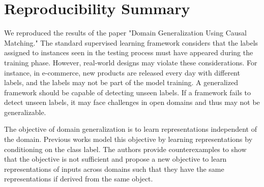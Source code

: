 \section*{\centering Reproducibility Summary}

We reproduced the results of the paper "Domain Generalization Using Causal Matching." The standard supervised learning framework considers that the labels assigned to instances seen in the testing process must have appeared during the training phase. However, real-world designs may violate these considerations. For instance, in e-commerce, new products are released every day with different labels, and the labels may not be part of the model training. A generalized framework should be capable of detecting unseen labels. If a framework fails to detect unseen labels, it may face challenges in open domains and thus may not be generalizable.

The objective of domain generalization is to learn representations independent of the domain. Previous works model this objective by learning representations by conditioning on the class label. The authors provide counterexamples to show that the objective is not sufficient and propose a new objective to learn representations of inputs across domains such that they have the same representations if derived from the same object.





